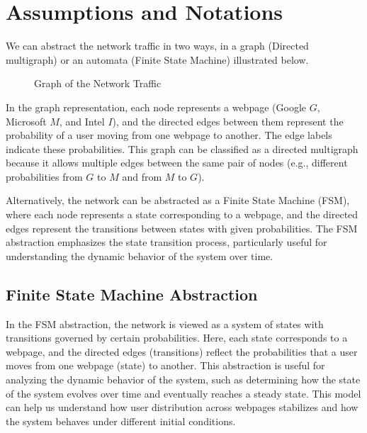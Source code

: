 \documentclass[12pt,a4paper]{article}
\newcommand{\drawV}[3]{
    \Vertex[x=#1, y=#2, size = 1, label = $#3$, fontscale = 1.5]{#3}
}
\newcommand{\drawL}[4]{
    \Edge[loopposition=#1, loopshape=#2, Direct, label = #3, fontscale = 1.2](#4)(#4)
}
\newcommand{\drawE}[4][0]{
    \Edge[Direct, bend = #1, label = #2, fontscale = 1.2](#3)(#4)
}
\begin{document}
\section*{Assumptions and Notations}
We can abstract the network traffic in two ways, in a graph (Directed multigraph) or an automata (Finite State Machine) illustrated below.
\begin{figure}[H]
    \centering
    \caption{Graph of the Network Traffic}
    \label{fig:network-traffic}
\end{figure}
In the graph representation, each node represents a webpage (Google \(G\), Microsoft \(M\), and Intel \(I\)), and the directed edges between them represent the probability of a user moving from one webpage to another. The edge labels indicate these probabilities. This graph can be classified as a directed multigraph because it allows multiple edges between the same pair of nodes (e.g., different probabilities from \(G\) to \(M\) and from \(M\) to \(G\)).

Alternatively, the network can be abstracted as a Finite State Machine (FSM), where each node represents a state corresponding to a webpage, and the directed edges represent the transitions between states with given probabilities. The FSM abstraction emphasizes the state transition process, particularly useful for understanding the dynamic behavior of the system over time.


\subsection*{Finite State Machine Abstraction}
In the FSM abstraction, the network is viewed as a system of states with transitions governed by certain probabilities. Here, each state corresponds to a webpage, and the directed edges (transitions) reflect the probabilities that a user moves from one webpage (state) to another. This abstraction is useful for analyzing the dynamic behavior of the system, such as determining how the state of the system evolves over time and eventually reaches a steady state. This model can help us understand how user distribution across webpages stabilizes and how the system behaves under different initial conditions.
\end{document}
